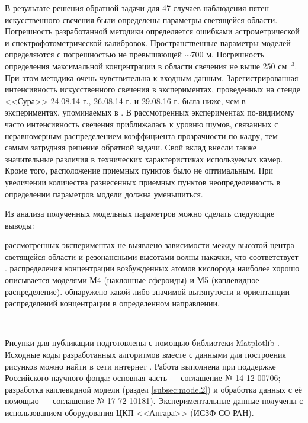 \documentclass[12pt,a4paper]{article}
\begin{document}
В результате решения обратной задачи для 47 случаев наблюдения пятен искусственного свечения были определены параметры светящейся области. Погрешность разработанной методики определяется ошибками астрометрической и спектрофотометрической калибровок. Пространственные параметры моделей определяются с погрешностью не превышающей $\sim700$ м. Погрешность определения максимальной концентрации в области свечения не выше $250$ см$^{-3}$. При этом методика очень чувствительна к входным данным. Зарегистрированная интенсивность искусственного свечения в экспериментах, проведенных на стенде <<Сура>> 24.08.14 г., 26.08.14 г. и 29.08.16 г. была ниже, чем в экспериментах, упоминаемых в \cite{Grach2012,Shindin2014,Klimenko2017}. В рассмотренных экспериментах по-видимому часто интенсивность свечения приближалась к уровню шумов, связанных с неравномерным распределением коэффициента прозрачности по кадру, тем самым затрудняя решение обратной задачи. Свой вклад внесли также значительные различия в технических характеристиках используемых камер. Кроме того, расположение приемных пунктов было не оптимальным. При увеличении количества разнесенных приемных пунктов неопределенность в определении параметров модели должна уменьшиться.

Из анализа полученных модельных параметров можно сделать следующие выводы:
\begin{enumerate}
	 рассмотренных экспериментах не выявлено зависимости между высотой центра светящейся области и резонансными высотами волны накачки, что соответствует \cite{Gustavsson2001}.
	 распределения концентрации возбужденных атомов кислорода наиболее хорошо описывается моделями М4 (наклонные сфероиды) и М5 (каплевидное распределение).
	 обнаружено какой-либо значимой вытянутости и ориентанции распределений концентрации в определенном направлении.
\end{enumerate}

~\

Рисунки для публикации подготовлены с помощью библиотеки Mat\-plotlib \cite{Hunter2007}. Исходные коды разработанных алгоритмов вместе с данными для построения рисунков можно найти в сети интернет \cite{Shindin2017}.
Работа выполнена при поддержке Российского научного фонда: основная часть --- соглашение № 14-12-00706; разработка каплевидной модели (раздел \ref{subsec:model2}) и обработка данных с её помощью --- соглашение № 17-72-10181). Экспериментальные данные получены с использованием оборудования ЦКП <<Ангара>> (ИСЗФ СО РАН). 


\end{document}

